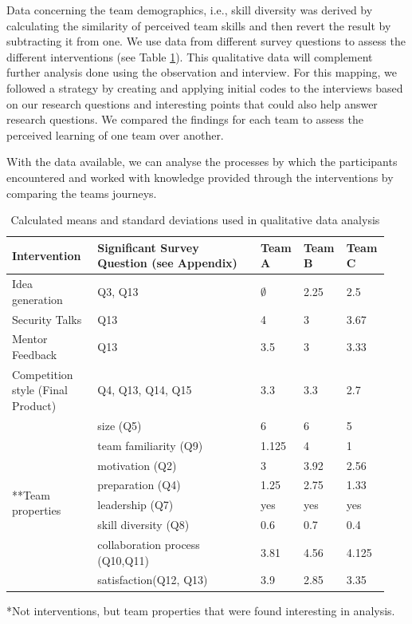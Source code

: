 \documentclass[runningheads]{llncs}
\begin{document}
Data concerning the team demographics, i.e., skill diversity was derived by calculating the similarity of perceived team skills and then revert the result by subtracting it from one.
We use data from different survey questions to assess the different interventions (see Table \ref{tab:teambinter}). This qualitative data will complement further analysis done using the observation and interview. For this mapping, we followed a strategy \cite{braun2006using} by creating and applying initial codes to the interviews based on our research questions and interesting points that could also help answer research questions. We compared the findings for each team to assess the perceived learning of one team over another.

With the data available, we can analyse the processes by which the participants encountered and worked with knowledge provided through the interventions by comparing the teams journeys.
\begin{table}[h]
    \caption{Calculated means and standard deviations used in qualitative data analysis}
    \label{tab:teambinter}
    \begin{tabular}{|p{0.22\linewidth}|p{0.42\linewidth}|p{0.1\linewidth}|p{0.1\linewidth}|p{0.1\linewidth}|}\hline
	Intervention & Significant \newline Survey Question (see Appendix) &  Team A & Team B & Team C \\ \hline
	Idea generation & Q3, Q13 & $\emptyset$ & 2.25 & 2.5  \\ \hline
	Security Talks  & Q13 &  4 & 3 & 3.67   \\ \hline
	Mentor Feedback  & Q13 &  3.5 & 3 & 3.33 \\ \hline
	Competition style \newline (Final Product) & Q4, Q13, Q14, Q15 & 3.3 & 3.3 & 2.7   \\ \hline
	\multirow{8}{*}{**Team properties} & size (Q5) & 6 & 6 & 5  \\\cline{2-5}
	& team familiarity (Q9) & 1.125 & 4 & 1  \\ \cline{2-5}
	& motivation (Q2) & 3 & 3.92 & 2.56  \\ \cline{2-5}
	& preparation (Q4) & 1.25 & 2.75 & 1.33  \\ \cline{2-5}
	& leadership (Q7) & yes & yes & yes  \\ \cline{2-5}
	& skill diversity (Q8) & 0.6 & 0.7 & 0.4  \\ \cline{2-5}
	& collaboration process (Q10,Q11) & 3.81 & 4.56 & 4.125  \\ \cline{2-5}
	& satisfaction(Q12, Q13) & 3.9 & 2.85 & 3.35  \\ \hline
    \end{tabular}
    *Not interventions, but team properties that were found interesting in analysis.
\end{table}
\end{document}
